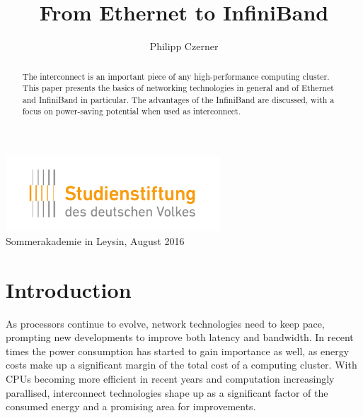 \documentclass[12pt, a4paper]{article}
\begin{document}
\title{%
  {\bfseries From Ethernet to InfiniBand}\\[1ex] %
}
\author{ Philipp Czerner} %

\date{\vspace{-5ex}} %

{\sf \maketitle} %

\begin{center}
  \includegraphics[width=8cm]{logo_sdv.pdf}\\
  {\large\sf Sommerakademie in Leysin, August 2016}
\end{center}

\vspace{1cm}

\begin{abstract}
  The interconnect is an important piece of any high-performance computing cluster. This paper presents the basics of networking technologies in general and of Ethernet and InfiniBand in particular. The advantages of the InfiniBand are discussed, with a focus on power-saving potential when used as interconnect. 
\end{abstract}

\newpage
\tableofcontents

\newpage
\section{Introduction}\label{sec:introduction}
As processors continue to evolve, network technologies need to keep pace, prompting new developments to improve both latency and bandwidth. In recent times the power consumption has started to gain importance as well, as energy costs make up a significant margin of the total cost of a computing cluster. With CPUs becoming more efficient in recent years and computation increasingly parallised, interconnect technologies shape up as a significant factor of the consumed energy and a promising area for improvements.
\end{document}
